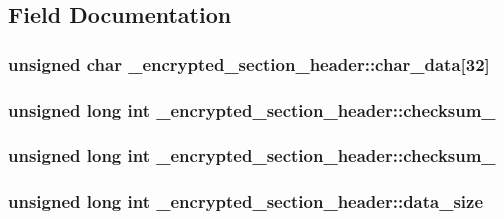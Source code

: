\subsection{\-Field \-Documentation}
\hypertarget{union__encrypted__section__header_a1377ace2175b5f607cdb548b5d6c79e2}{
\subsubsection[{char\-\_\-data}]{\setlength{\rightskip}{0pt plus 5cm}unsigned char {\bf \-\_\-encrypted\-\_\-section\-\_\-header\-::char\-\_\-data}\mbox{[}32\mbox{]}}}\label{union__encrypted__section__header_a1377ace2175b5f607cdb548b5d6c79e2}
\hypertarget{union__encrypted__section__header_af0a32fff19f4f02875b9b569faef4afb}{
\subsubsection[{checksum\-\_\-1}]{\setlength{\rightskip}{0pt plus 5cm}unsigned long int {\bf \-\_\-encrypted\-\_\-section\-\_\-header\-::checksum\-\_}}}\label{union__encrypted__section__header_af0a32fff19f4f02875b9b569faef4afb}
\hypertarget{union__encrypted__section__header_ad2caaf2abf58832bc167a9d671d5d66b}{
\subsubsection[{checksum\-\_\-2}]{\setlength{\rightskip}{0pt plus 5cm}unsigned long int {\bf \-\_\-encrypted\-\_\-section\-\_\-header\-::checksum\-\_}}}\label{union__encrypted__section__header_ad2caaf2abf58832bc167a9d671d5d66b}
\hypertarget{union__encrypted__section__header_afd8e77d45a87dd17453802698d82fee4}{
\subsubsection[{data\-\_\-size}]{\setlength{\rightskip}{0pt plus 5cm}unsigned long int {\bf \-\_\-encrypted\-\_\-section\-\_\-header\-::data\-\_\-size}}}\label{union__encrypted__section__header_afd8e77d45a87dd17453802698d82fee4}
